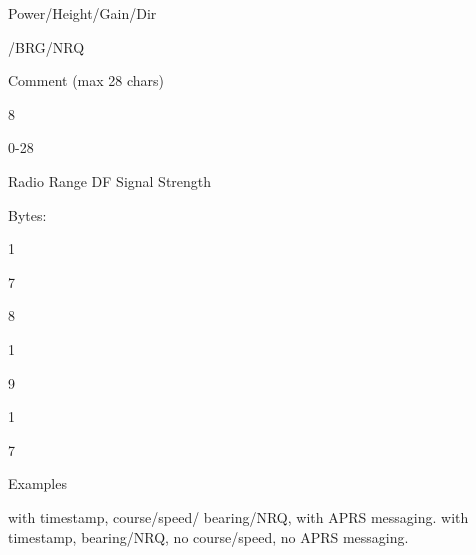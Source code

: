 Power/Height/Gain/Dir

/BRG/NRQ

Comment
(max 28
chars)

8

0-28

Radio Range
DF Signal Strength

Bytes:

1

7

8

1

9

1

7

Examples



with timestamp, course/speed/
bearing/NRQ, with APRS messaging.
with timestamp, bearing/NRQ, no
course/speed, no APRS messaging.



